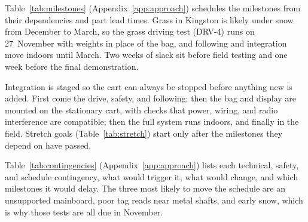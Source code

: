 \label{sec:approach-milestones}

Table~\ref{tab:milestones} (Appendix~\ref{app:approach}) schedules the milestones from their dependencies and part lead times. Grass in Kingston is likely under snow from December to March, so the grass driving test (DRV-4) runs on 27~November with weights in place of the bag, and following and integration move indoors until March. Two weeks of slack sit before field testing and one week before the final demonstration.

Integration is staged so the cart can always be stopped before anything new is added. First come the drive, safety, and following; then the bag and display are mounted on the stationary cart, with checks that power, wiring, and radio interference are compatible; then the full system runs indoors, and finally in the field. Stretch goals (Table~\ref{tab:stretch}) start only after the milestones they depend on have passed.

\label{sec:approach-contingency}

Table~\ref{tab:contingencies} (Appendix~\ref{app:approach}) lists each technical, safety, and schedule contingency, what would trigger it, what would change, and which milestones it would delay. The three most likely to move the schedule are an unsupported mainboard, poor tag reads near metal shafts, and early snow, which is why those tests are all due in November.

